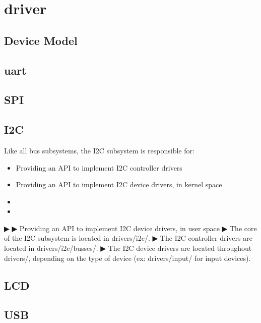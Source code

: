 \part{driver}


\chapter{Device Model}





\chapter{uart}


\chapter{SPI}


\chapter{I2C}
Like all bus subsystems, the I2C subsystem is responsible for:
\begin{itemize}
\item Providing an API to implement I2C controller drivers
\item Providing an API to implement I2C device drivers, in kernel space
\item
\item
\end{itemize}

▶
▶ Providing an API to implement I2C device drivers, in user space
▶ The core of the I2C subsystem is located in drivers/i2c/.
▶ The I2C controller drivers are located in drivers/i2c/busses/.
▶ The I2C device drivers are located throughout drivers/, depending on the type
of device (ex: drivers/input/ for input devices).








\chapter{LCD}



\chapter{USB}
